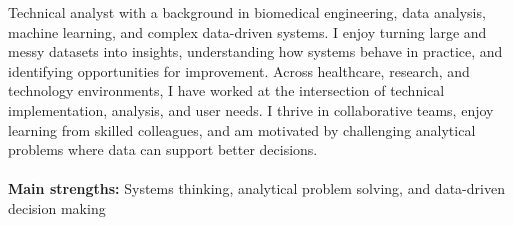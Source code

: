 Technical analyst with a background in biomedical engineering, data analysis, machine learning, and complex data-driven 
systems. I enjoy turning large and messy datasets into insights, understanding how systems behave in practice, and 
identifying opportunities for improvement. Across healthcare, research, and technology environments, I have worked at the 
intersection of technical implementation, analysis, and user needs. I thrive in collaborative teams, enjoy learning from 
skilled colleagues, and am motivated by challenging analytical problems where data can support better decisions.
\\\\
\textbf{Main strengths:} \textcolor{cvSectionHeadingColor}{Systems thinking, analytical problem solving, and data-driven decision making}
